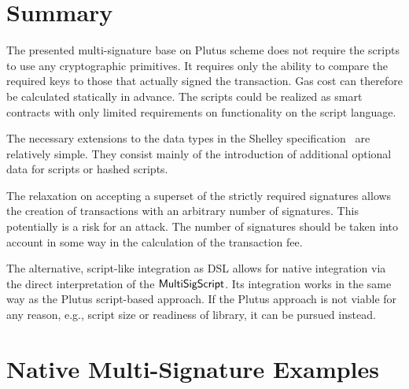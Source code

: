 \documentclass[11pt,a4paper,dvipsnames]{article}
\theoremstyle{definition}
\begin{document}
\section{Summary}
\label{sec:summary}

The presented multi-signature base on Plutus scheme does not require the scripts
to use any cryptographic primitives. It requires only the ability to compare the
required keys to those that actually signed the transaction. Gas cost can
therefore be calculated statically in advance. The scripts could be realized as
smart contracts with only limited requirements on functionality on the script
language.

The necessary extensions to the data types in the Shelley
specification~\cite{shelley_formal_spec} are relatively simple. They consist
mainly of the introduction of additional optional data for scripts or hashed
scripts.

The relaxation on accepting a superset of the strictly required signatures
allows the creation of transactions with an arbitrary number of signatures. This
potentially is a risk for an attack. The number of signatures should be taken
into account in some way in the calculation of the transaction fee.

The alternative, script-like integration as DSL allows for native integration
via the direct interpretation of the $\mathsf{MultiSigScript}$. Its integration
works in the same way as the Plutus script-based approach. If the Plutus
approach is not viable for any reason, e.g., script size or readiness of
library, it can be pursued instead.



\appendix

\section{Native Multi-Signature Examples}
\label{sec:native-multi-sign}
\end{document}
